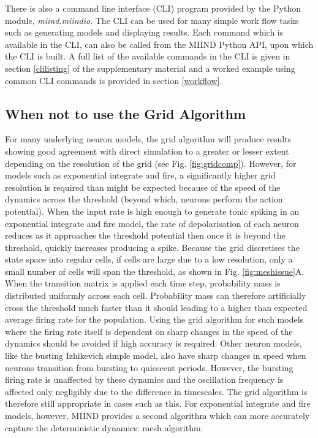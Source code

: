 \documentclass[utf8]{frontiersSCNS} %
\begin{document}
There is also a command line interface (CLI) program provided by the Python module, \textit{miind.miindio}. The CLI can be used for many simple work flow tasks such as generating models and displaying results. Each command which is available in the CLI, can also be called from the MIIND Python API, upon which the CLI is built. A full list of the available commands in the CLI is given in section \ref{clilisting} of the supplementary material and a worked example using common CLI commands is provided in section \ref{workflow}. \\

\subsection{When not to use the Grid Algorithm}
For many underlying neuron models, the grid algorithm will produce results showing good agreement with direct simulation to a greater or lesser extent depending on the resolution of the grid (see Fig. \ref{fig:gridcomp}). However, for models such as exponential integrate and fire, a significantly higher grid resolution is required than might be expected because of the speed of the dynamics across the threshold (beyond which, neurons perform the action potential). When the input rate is high enough to generate tonic spiking in an exponential integrate and fire model, the rate of depolarisation of each neuron reduces as it approaches the threshold potential then once it is beyond the threshold, quickly increases producing a spike. Because the grid discretises the state space into regular cells, if cells are large due to a low resolution, only a small number of cells will span the threshold, as shown in Fig. \ref{fig:meshissue}A. When the transition matrix is applied each time step, probability mass is distributed uniformly across each cell. Probability mass can therefore artificially cross the threshold much faster than it should leading to a higher than expected average firing rate for the population. Using the grid algorithm for such models where the firing rate itself is dependent on sharp changes in the speed of the dynamics should be avoided if high accuracy is required. Other neuron models, like the busting Izhikevich simple model, also have sharp changes in speed when neurons transition from bursting to quiescent periods. However, the bursting firing rate is unaffected by these dynamics and the oscillation frequency is affected only negligibly due to the difference in timescales. The grid algorithm is therefore still appropriate in cases such as this. For exponential integrate and fire models, however, MIIND provides a second algorithm which can more accurately capture the deterministic dynamics: mesh algorithm. 
\end{document}
